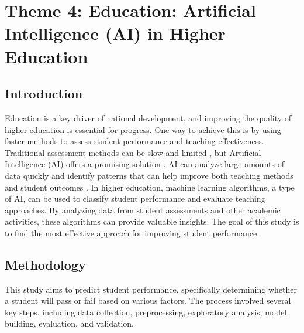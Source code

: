 \documentclass[preprint, 3p,
authoryear]{elsarticle} %
\begin{document}
\section{Theme 4: Education: Artificial Intelligence (AI) in Higher
Education}\label{theme-4-education-artificial-intelligence-ai-in-higher-education}

\subsection{Introduction}\label{introduction-1}

Education is a key driver of national development, and improving the
quality of higher education is essential for progress. One way to
achieve this is by using faster methods to assess student performance
and teaching effectiveness. Traditional assessment methods can be slow
and limited \citep{bennett2011formative}, but Artificial Intelligence
(AI) offers a promising solution \citep{luckin2016intelligence}. AI can
analyze large amounts of data quickly and identify patterns that can
help improve both teaching methods and student outcomes
\citep{baker2014educational}. In higher education, machine learning
algorithms, a type of AI, can be used to classify student performance
and evaluate teaching approaches. By analyzing data from student
assessments and other academic activities, these algorithms can provide
valuable insights. The goal of this study is to find the most effective
approach for improving student performance.

\subsection{Methodology}\label{methodology-1}

This study aims to predict student performance, specifically determining
whether a student will pass or fail based on various factors. The
process involved several key steps, including data collection,
preprocessing, exploratory analysis, model building, evaluation, and
validation.
\end{document}
